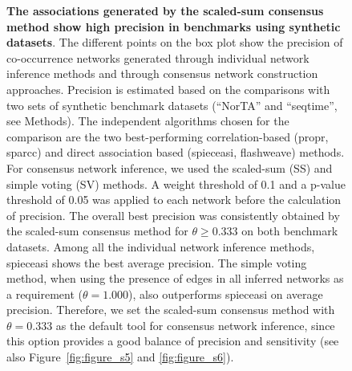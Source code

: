 \documentclass[letterpaper,12pt]{article}
\begin{document}
  \begin{figure}[H]
    \centering
    \caption{
      \textbf{The associations generated by the scaled-sum consensus method show high precision in benchmarks using synthetic datasets}.
    The different points on the box plot show the precision of co-occurrence networks generated through individual network inference methods and through consensus network construction approaches. Precision is estimated based on the comparisons with two sets of synthetic benchmark datasets (``NorTA'' and ``seqtime'', see Methods).
      The independent algorithms chosen for the comparison are the two best-performing correlation-based (propr, sparcc) and direct association based (spieceasi, flashweave) methods.
      For consensus network inference, we used the scaled-sum (SS) and simple voting (SV) methods.
      A weight threshold of 0.1 and a p-value threshold of 0.05 was applied to each network before the calculation of precision.
      The overall best precision was consistently obtained by the scaled-sum consensus method for $\theta \geq 0.333$ on both benchmark datasets. Among all the individual network inference methods, spieceasi shows the best average precision.
      The simple voting method, when using the presence of edges in all inferred networks as a requirement ($\theta = 1.000$), also outperforms spieceasi on average precision.
      Therefore, we set the scaled-sum consensus method with $\theta = 0.333$ as the default tool for consensus network inference, since this option provides a good balance of precision and sensitivity (see also Figure~\ref{fig:figure_s5} and \ref{fig:figure_s6}).
    }
    \label{fig:figure5}
  \end{figure}
\end{document}
